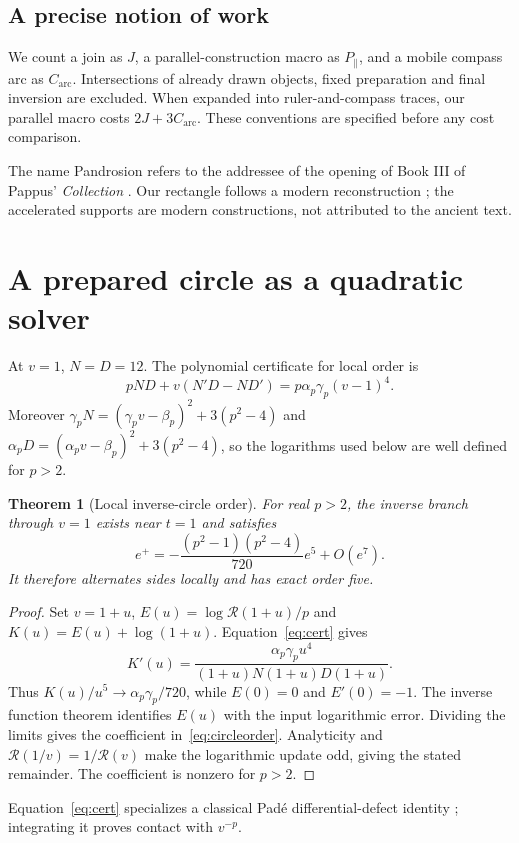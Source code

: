 \documentclass[11pt,a4paper]{article}
\newtheorem{theorem}{Theorem}[section]\newtheorem{proposition}[theorem]{Proposition}
\begin{document}
\subsection{A precise notion of work}
We count a join as $J$, a parallel-construction macro as $P_{\parallel}$, and a mobile compass arc as $C_{\mathrm{arc}}$. Intersections of already drawn objects, fixed preparation and final inversion are excluded. When expanded into ruler-and-compass traces, our parallel macro costs $2J+3C_{\mathrm{arc}}$. These conventions are specified before any cost comparison.

The name Pandrosion refers to the addressee of the opening of Book III of Pappus' \emph{Collection} \cite{pappusLittle2023}. Our rectangle follows a modern reconstruction \cite{launayPandrosion}; the accelerated supports are modern constructions, not attributed to the ancient text.

\clearpage
\section{A prepared circle as a quadratic solver}\label{sec:circle}
At $v=1$, $N=D=12$. The polynomial certificate for local order is
\begin{equation}\label{eq:cert}
 pND+v(N'D-ND')=p\alpha_p\gamma_p(v-1)^4.
\end{equation}
Moreover $\gamma_pN=(\gamma_pv-\beta_p)^2+3(p^2-4)$ and $\alpha_pD=(\alpha_pv-\beta_p)^2+3(p^2-4)$, so the logarithms used below are well defined for $p>2$.

\begin{theorem}[Local inverse-circle order]\label{thm:circlelocal}
For real $p>2$, the inverse branch through $v=1$ exists near $t=1$ and satisfies
\begin{equation}\label{eq:circleorder}
 e^+=-\frac{(p^2-1)(p^2-4)}{720}e^5+O(e^7).
\end{equation}
It therefore alternates sides locally and has exact order five.
\end{theorem}
\begin{proof}
Set $v=1+u$, $E(u)=\log\mathcal R(1+u)/p$ and $K(u)=E(u)+\log(1+u)$. Equation~\eqref{eq:cert} gives
\[
 K'(u)=\frac{\alpha_p\gamma_pu^4}{(1+u)N(1+u)D(1+u)}.
\]
Thus $K(u)/u^5\to\alpha_p\gamma_p/720$, while $E(0)=0$ and $E'(0)=-1$. The inverse function theorem identifies $E(u)$ with the input logarithmic error. Dividing the limits gives the coefficient in~\eqref{eq:circleorder}. Analyticity and $\mathcal R(1/v)=1/\mathcal R(v)$ make the logarithmic update odd, giving the stated remainder. The coefficient is nonzero for $p>2$.
\end{proof}
Equation~\eqref{eq:cert} specializes a classical Pad\'e differential-defect identity \cite[proof of Theorem~2.4]{karp2011}; integrating it proves contact with $v^{-p}$.
\end{document}
